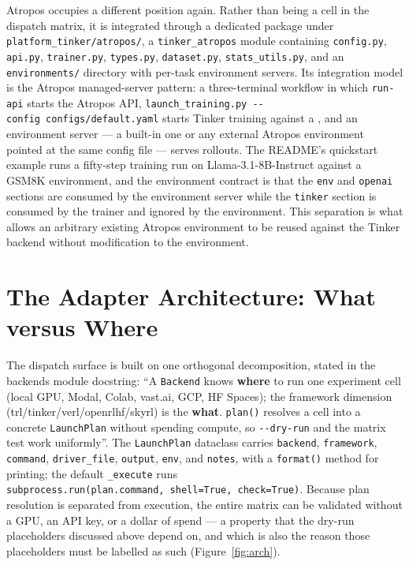 \documentclass[12pt,a4paper]{report}
\DeclareRobustCommand{\longtok}[1]{\texttt{\seqsplit{#1}}}
\begin{document}
Atropos occupies a different position again. Rather than being a cell in
the dispatch matrix, it is integrated through a dedicated package under
\texttt{platform\_tinker/atropos/}, a \texttt{tinker\_atropos} module
containing \texttt{config.py}, \texttt{api.py}, \texttt{trainer.py},
\texttt{types.py}, \texttt{dataset.py}, \texttt{stats\_utils.py}, and an
\texttt{environments/} directory with per-task environment servers. Its
integration model is the Atropos managed-server pattern: a
three-terminal workflow in which \texttt{run-api} starts the Atropos
API, \texttt{launch\_training.py\ -\/-config\ configs/default.yaml}
starts Tinker training against a \longtok{TINKER\_\allowbreak{}API\_\allowbreak{}KEY}, and an
environment server --- a built-in one or any external Atropos
environment pointed at the same config file --- serves rollouts. The
README's quickstart example runs a fifty-step training run on
Llama-3.1-8B-Instruct against a GSM8K environment, and the environment
contract is that the \texttt{env} and \texttt{openai} sections are
consumed by the environment server while the \texttt{tinker} section is
consumed by the trainer and ignored by the environment. This separation
is what allows an arbitrary existing Atropos environment to be reused
against the Tinker backend without modification to the environment.

\section{The Adapter Architecture: What versus
Where}\label{the-adapter-architecture-what-versus-where}

The dispatch surface is built on one orthogonal decomposition, stated in
the backends module docstring: ``A \texttt{Backend} knows \textbf{where}
to run one experiment cell (local GPU, Modal, Colab, vast.ai, GCP, HF
Spaces); the framework dimension (trl/tinker/verl/openrlhf/skyrl) is the
\textbf{what}. \texttt{plan()} resolves a cell into a concrete
\texttt{LaunchPlan} without spending compute, so \texttt{-\/-dry-run}
and the matrix test work uniformly''. The \texttt{LaunchPlan} dataclass
carries \texttt{backend}, \texttt{framework}, \texttt{command},
\texttt{driver\_file}, \texttt{output}, \texttt{env}, and
\texttt{notes}, with a \texttt{format()} method for printing; the
default \texttt{\_execute} runs
\texttt{subprocess.run(plan.command,\allowbreak{}\ shell=\allowbreak{}True,\allowbreak{}\ check=\allowbreak{}True)}. Because
plan resolution is separated from execution, the entire matrix can be
validated without a GPU, an API key, or a dollar of spend --- a property
that the dry-run placeholders discussed above depend on, and which is
also the reason those placeholders must be labelled as such (Figure~\ref{fig:arch}).
\end{document}
